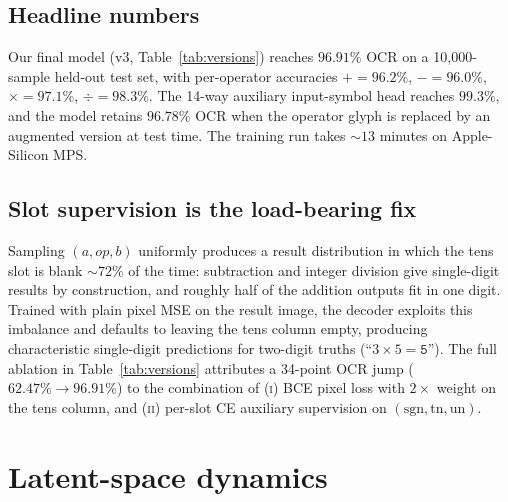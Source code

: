 \documentclass[11pt]{article}
\theoremstyle{papsty}
\begin{document}
\subsection{Headline numbers}
\label{sec:headline}

Our final model (v3, Table~\ref{tab:versions}) reaches $96.91\%$ OCR
on a 10{,}000-sample held-out test set, with per-operator accuracies
$+\!\!=\!96.2\%$, $-\!=\!96.0\%$, $\times\!=\!97.1\%$,
$\div\!=\!98.3\%$. The 14-way auxiliary input-symbol head reaches
$99.3\%$, and the model retains $96.78\%$ OCR when the operator glyph
is replaced by an augmented version at test time. The training run
takes $\sim 13$ minutes on Apple-Silicon MPS.

\subsection{Slot supervision is the load-bearing fix}
\label{sec:slot-fix}

Sampling $(a, op, b)$ uniformly produces a result distribution in which
the tens slot is blank $\sim 72\%$ of the time:
subtraction and integer division give single-digit results by
construction, and roughly half of the addition outputs fit in one
digit. Trained with plain pixel MSE on the result image, the decoder
exploits this imbalance and defaults to leaving the tens column empty,
producing characteristic single-digit predictions for two-digit truths
(``$3 \times 5 = \texttt{5}$''). The full ablation in
Table~\ref{tab:versions} attributes a 34-point OCR jump
($62.47\%\!\to\!96.91\%$) to the combination of
\textsc{(i)} BCE pixel loss with $2\!\times$ weight on the tens column,
and
\textsc{(ii)} per-slot CE auxiliary supervision on
$(\mathrm{sgn}, \mathrm{tn}, \mathrm{un})$.

\section{Latent-space dynamics}
\label{sec:dynamics}
\end{document}
